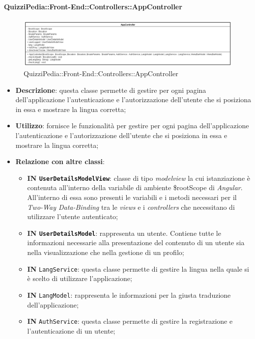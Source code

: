 \paragraph{QuizziPedia::Front-End::Controllers::AppController}
\begin{figure} [ht]
	\centering
	\includegraphics[scale=0.35]{UML/Classi/Front-End/QuizziPedia_Front-end_Controller_AppController.png}
	\caption{QuizziPedia::Front-End::Controllers::AppController}
\end{figure} \FloatBarrier
\begin{itemize}
	\item \textbf{Descrizione}: questa classe permette di gestire per ogni pagina dell'applicazione l'autenticazione e l'autorizzazione dell'utente che si posiziona in essa e mostrare la lingua corretta;
	\item \textbf{Utilizzo}: fornisce le funzionalità per gestire per ogni pagina dell'applicazione l'autenticazione e l'autorizzazione dell'utente che si posiziona in essa e mostrare la lingua corretta;
	\item \textbf{Relazione con altre classi}:
	\begin{itemize}
		\item \textbf{IN \texttt{UserDetailsModelView}}: classe di tipo \textit{modelview} la cui istanziazione è contenuta all'interno della variabile di ambiente \$rootScope di \textit{Angular}. All'interno di essa sono presenti le variabili e i metodi necessari per il \textit{Two-Way Data-Binding} tra le \textit{views} e i \textit{controllers} che necessitano di utilizzare l'utente autenticato;
		\item \textbf{IN \texttt{UserDetailsModel}}: rappresenta un utente. Contiene tutte le informazioni necessarie alla presentazione del contenuto di un utente sia nella visualizzazione che nella gestione di un profilo;
		\item \textbf{IN} \texttt{LangService}: questa classe permette di gestire la lingua nella quale si è scelto di utilizzare l'applicazione;
		\item \textbf{IN} \texttt{LangModel}: rappresenta le informazioni per la giusta traduzione dell'applicazione;
		\item \textbf{IN} \texttt{AuthService}: questa classe permette di gestire la registrazione e l'autenticazione di un utente;

\end{itemize}
\end{itemize}
